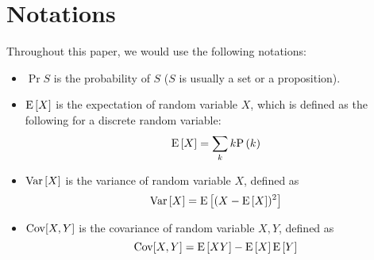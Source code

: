 
\section*{Notations}
Throughout this paper, we would use the following notations:
\begin{itemize}
	\item $\Pr{S}$ is the probability of $S$ ($S$ is usually a set or a
		proposition).
	\item $\text{E}\left[X\right]$ is the expectation of random variable $X$, which is defined
		as the following for a discrete random variable:
		\begin{equation*}
			\E{X} = \sum_k k\P{k}
		\end{equation*}
	\item $\text{Var}\left[X\right]$ is the variance of random variable $X$, defined as
		\begin{equation*}
			\text{Var}\left[X\right] = \text{E}\left[(X-\text{E}\left[X\right])^2\right]
		\end{equation*}
	\item $\operatorname{Cov}[X,Y]$ is the covariance of random variable $X, Y$, defined as
		\begin{equation*}
			\operatorname{Cov}[X,Y] = \text{E}\left[XY\right]-\text{E}\left[X\right]\text{E}\left[Y\right]
		\end{equation*}
\end{itemize}


